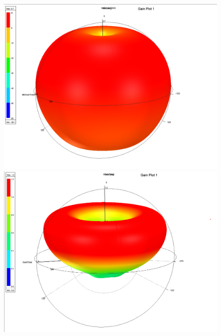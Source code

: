 \documentclass[10pt, a4paper]{article}%
\begin{document}
	\begin{figure}[ht!]
		\centering
		\begin{minipage}{.5\textwidth}
		  \centering
		  \includegraphics[height = 0.3\textheight]{log_scale.png}
		\end{minipage}%
		\begin{minipage}{.5\textwidth}
		  \centering
		  \includegraphics[height = 0.3\textheight]{normal_scale.png}
		\end{minipage}
		\end{figure}
\end{document}
